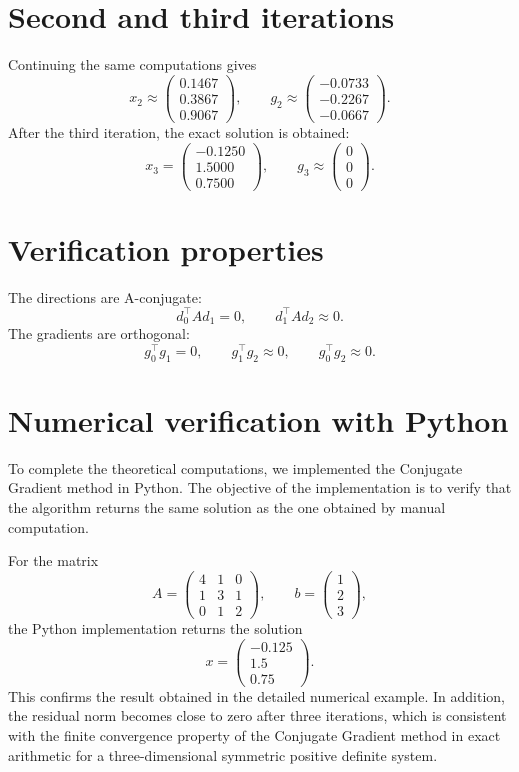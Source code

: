 \documentclass[11pt,a4paper]{report}
\theoremstyle{definition}
\theoremstyle{plain}
\theoremstyle{remark}
\begin{document}
\section{Second and third iterations}

Continuing the same computations gives
\[
x_2\approx
\begin{pmatrix}
0.1467\\
0.3867\\
0.9067
\end{pmatrix},
\qquad
g_2\approx
\begin{pmatrix}
-0.0733\\
-0.2267\\
-0.0667
\end{pmatrix}.
\]
After the third iteration, the exact solution is obtained:
\[
x_3=
\begin{pmatrix}
-0.1250\\
1.5000\\
0.7500
\end{pmatrix},
\qquad
g_3\approx
\begin{pmatrix}
0\\
0\\
0
\end{pmatrix}.
\]

\section{Verification properties}

The directions are A-conjugate:
\[
d_0^\top A d_1=0,
\qquad
d_1^\top A d_2\approx 0.
\]
The gradients are orthogonal:
\[
g_0^\top g_1=0,
\qquad
g_1^\top g_2\approx 0,
\qquad
g_0^\top g_2\approx 0.
\]

\section{Numerical verification with Python}

To complete the theoretical computations, we implemented the Conjugate Gradient method in Python. The objective of the implementation is to verify that the algorithm returns the same solution as the one obtained by manual computation.

For the matrix
\[
A=
\begin{pmatrix}
4 & 1 & 0\\
1 & 3 & 1\\
0 & 1 & 2
\end{pmatrix},
\qquad
b=
\begin{pmatrix}
1\\2\\3
\end{pmatrix},
\]
the Python implementation returns the solution
\[
x=
\begin{pmatrix}
-0.125\\
1.5\\
0.75
\end{pmatrix}.
\]
This confirms the result obtained in the detailed numerical example. In addition, the residual norm becomes close to zero after three iterations, which is consistent with the finite convergence property of the Conjugate Gradient method in exact arithmetic for a three-dimensional symmetric positive definite system.
\end{document}
